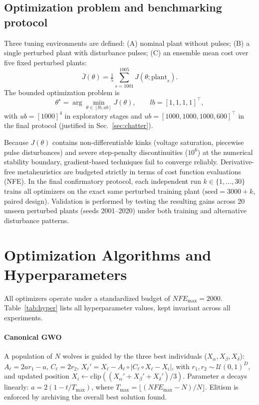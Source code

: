 \documentclass[a4paper,fleqn]{cas-dc}
\begin{document}
\subsection{Optimization problem and benchmarking protocol}\label{sec:probform}
Three tuning environments are defined: (A) nominal plant without pulses; (B) a single perturbed plant with disturbance pulses; (C) an ensemble mean cost over five fixed perturbed plants:
\begin{equation}
\bar J(\theta)=\tfrac15\textstyle\sum_{s=1001}^{1005}J(\theta;\mathrm{plant}_s).
\label{eq:barJ}
\end{equation}
The bounded optimization problem is
\begin{equation}
\theta^\star=\arg\min_{\theta\in[lb,ub]}J(\theta),\qquad lb=[1,1,1,1]^\top,
\label{eq:optprob}
\end{equation}
with $ub=[1000]^4$ in exploratory stages and $ub=[1000,1000,1000,600]^\top$ in the final protocol (justified in Sec.~\ref{sec:chatter}).

Because $J(\theta)$ contains non-differentiable kinks (voltage saturation, piecewise pulse disturbances) and severe step-penalty discontinuities ($10^6$) at the numerical stability boundary, gradient-based techniques fail to converge reliably. Derivative-free metaheuristics are budgeted strictly in terms of cost function evaluations (NFE). In the final confirmatory protocol, each independent run $k\in\{1,\dots,30\}$ trains all optimizers on the exact same perturbed training plant ($\text{seed}=3000+k$, paired design). Validation is performed by testing the resulting gains across 20 unseen perturbed plants (seeds 2001--2020) under both training and alternative disturbance patterns.

\section{Optimization Algorithms and Hyperparameters}\label{sec:opt}
All optimizers operate under a standardized budget of $NFE_{\max}=2000$. Table~\ref{tab:hyper} lists all hyperparameter values, kept invariant across all experiments.

\paragraph{Canonical GWO \cite{mirjalili2014}} A population of $N$ wolves is guided by the three best individuals ($X_\alpha, X_\beta, X_\delta$): $A_\ell=2ar_1-a$, $C_\ell=2r_2$, $X_\ell'=X_\ell-A_\ell\circ|C_\ell\circ X_\ell-X_i|$, with $r_1,r_2\sim\mathcal U(0,1)^D$, and updated position $X_i\leftarrow\mathrm{clip}((X_\alpha'+X_\beta'+X_\delta')/3)$. Parameter $a$ decays linearly: $a=2(1-t/T_{\max})$, where $T_{\max}=\lfloor(NFE_{\max}-N)/N\rfloor$. Elitism is enforced by archiving the overall best solution found.
\end{document}
